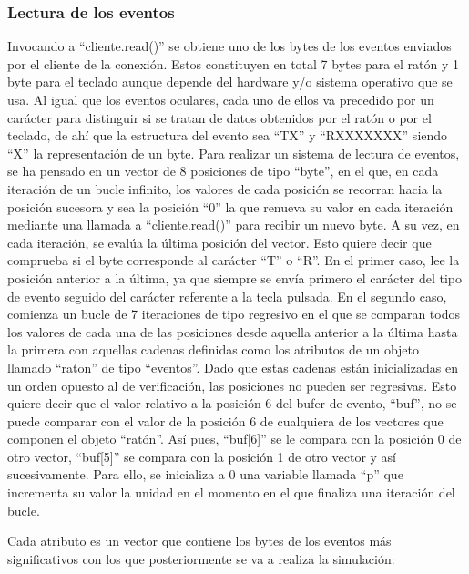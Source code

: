 \subsubsection{Lectura de los eventos}\label{s3_5_2_2}

Invocando a ``cliente.read()'' se obtiene uno de los bytes de los eventos enviados por el cliente de la conexión. Estos constituyen en total 7 bytes para el ratón y 1 byte para el teclado aunque depende del hardware y/o sistema operativo que se usa. Al igual que los eventos oculares, cada uno de ellos va precedido por un carácter para distinguir si se tratan de datos obtenidos por el ratón o por el teclado, de ahí que la estructura del evento sea ``TX'' y ``RXXXXXXX'' siendo ``X'' la representación de un byte. Para realizar un sistema de lectura de eventos, se ha pensado en un vector de 8 posiciones de tipo ``byte'', en el que, en cada iteración de un bucle infinito, los valores de cada posición se recorran hacia la posición sucesora y sea la posición ``0'' la que renueva su valor en cada iteración mediante una llamada a ``cliente.read()'' para recibir un nuevo byte. A su vez, en cada iteración, se evalúa la última posición del vector. Esto quiere decir que comprueba si el byte corresponde al carácter ``T'' o ``R''. En el primer caso, lee la posición anterior a la última, ya que siempre se envía primero el carácter del tipo de evento seguido del carácter referente a la tecla pulsada. En el segundo caso, comienza un bucle de 7 iteraciones de tipo regresivo en el que se comparan todos los valores de cada una de las posiciones desde aquella anterior a la última hasta la primera con aquellas cadenas definidas como los atributos de un objeto llamado ``raton'' de tipo ``eventos''. Dado que estas cadenas están inicializadas en un orden opuesto al de verificación, las posiciones no pueden ser regresivas. Esto quiere decir que el valor relativo a la posición 6 del bufer de evento, ``buf'', no se puede comparar con el valor de la posición 6 de cualquiera de los vectores que componen el objeto ``ratón''. Así pues, ``buf[6]'' se le compara con la posición 0 de otro vector, ``buf[5]'' se compara con la posición 1 de otro vector y así sucesivamente. Para ello, se inicializa a 0 una variable llamada ``p'' que incrementa su valor la unidad en el momento en el que finaliza una iteración del bucle.

Cada atributo es un vector que contiene los bytes de los eventos más significativos con los que posteriormente se va a realiza la simulación:

